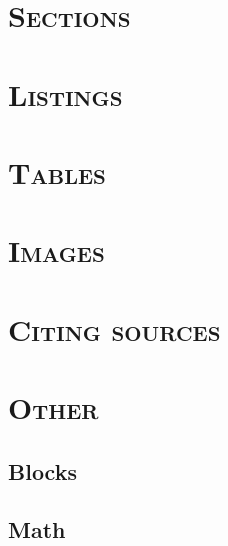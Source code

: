 \documentclass[10pt,xcolor=x11names,compress,fleqn]{beamer}
\begin{document}
  
  
  
  \section{\scshape Sections}  
  
  
  
  \section{\scshape Listings}  
  
  
  \section{\scshape Tables}
  
  
  \section{\scshape Images}
  
  
  \section{\scshape Citing sources}
  
  
  \section{\scshape Other}
  
  \subsection{Blocks}
  
  
  \subsection{Math}
  
  
\end{document}
